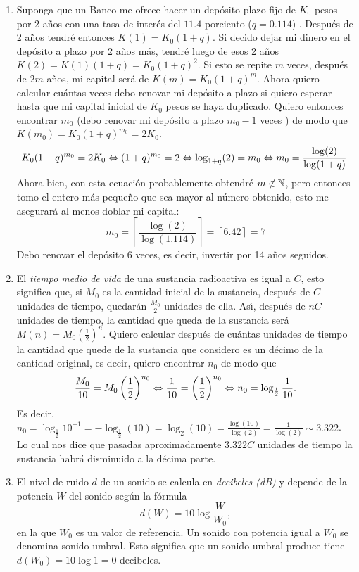\begin{enumerate}
\item Suponga que un Banco me ofrece hacer un dep\'osito
			plazo fijo de $K_0$ pesos por 2 a\~nos con una tasa de inter\'es
		del $11.4$ porciento ($q = 0.114$) .
		Despu\'es de 2 a\~nos tendr\'e entonces $K(1) = K_0(1+q)$.
		Si decido dejar mi dinero en el dep\'osito a plazo por 2 a\~nos m\'as,
		tendr\'e luego de esos 2 a\~nos $K(2) = K(1)(1+q) = K_0(1+q)^2$.
		Si esto se repite $m$ veces, despu\'es de $2m$ a\~nos, mi capital
		ser\'a de $K(m) = K_0(1+q)^m$.
		Ahora quiero calcular cu\'antas veces debo renovar mi dep\'osito a 
		plazo si quiero esperar hasta que mi capital inicial de $K_0$ pesos se 
		haya duplicado.
		Quiero entonces encontrar $m_0$ (debo renovar mi
		dep\'osito a plazo $m_0-1$ veces ) de modo que $K(m_0) = K_0(1+q)^{m_0} = 2K_0$.
		\[
				K_0(1+q)^{m_0} = 2K_0 \Leftrightarrow (1+q)^{m_0} = 2 \Leftrightarrow
				\log_{1+q}(2) = m_0 \Leftrightarrow m_0 = \frac{\log(2)}{\log(1+q)}.
		\]
		Ahora bien, con esta ecuación probablemente obtendré $m\not\in\mathbb{N}$, pero entonces tomo el entero más pequeño que sea mayor al número obtenido, esto me asegurará al menos doblar mi capital:
		$$m_0 = \left\lceil\frac{\log(2)}{\log(1.114)}\right\rceil=\left\lceil6.42\right\rceil=7$$
		Debo renovar el depósito 6 veces, es decir, invertir por 14 años seguidos.
\item El {\em tiempo medio de vida} de una sustancia radioactiva es 
		igual a $C$, esto significa que, si $M_0$ es la cantidad
		inicial de la sustancia, despu\'es de $C$ unidades de
		tiempo, quedar\'an $\frac{M_0}{2}$ unidades de ella.
		As\'{\i}, despu\'es de $nC$ unidades de tiempo, la cantidad
		que queda de la sustancia ser\'a $M(n) = M_0\left(\frac 1 2\right)^n$.
		Quiero calcular despu\'es de cu\'antas unidades de tiempo
		la cantidad que quede de la sustancia que considero es 
		un d\'ecimo de la cantidad original, es decir, 
		quiero encontrar $n_0$ de modo que 
		\[
			\frac{M_0}{10} = M_0\left(\frac 1 2\right)^{n_0}
				\Leftrightarrow \frac{1}{10} = \left(\frac 1 2\right)^{n_0}
				\Leftrightarrow n_0 = \log_{\frac 1 2}\frac{1}{10}.
		\]
		Es decir, $n_0 = \log_{\frac 1 2}10^{-1} = -\log_{\frac 1 2}(10) = 
		\log_2(10)=\frac{\log(10)}{\log(2)}=\frac{1}{\log(2)}\sim3.322$.
		Lo cual nos dice que pasadas aproximadamente $3.322C$ unidades de tiempo la sustancia habrá disminuido a la décima parte.
\item El nivel de ruido $d$ de un sonido se calcula en {\em decibeles (dB)} y depende de la potencia $W$
		del sonido seg\'un la f\'ormula
		\[
			d(W) = 10\log\dfrac{W}{W_0},
		\]
		en la que $W_0$ es un valor de referencia. Un sonido con potencia igual a $W_0$ se denomina sonido umbral.
		Esto significa que un sonido umbral produce tiene $d(W_0)=10\log1=0$ decibeles.
		

\end{enumerate}
